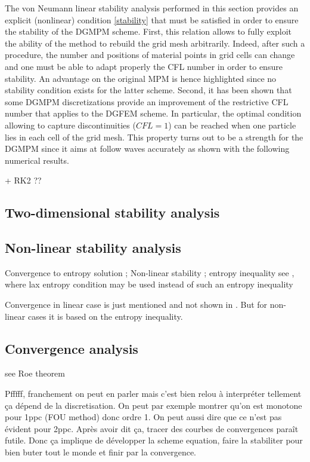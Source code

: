 The von Neumann linear stability analysis performed in this section provides an explicit (nonlinear) condition \eqref{stability} that must be satisfied in order to ensure the stability of the DGMPM scheme. First, this relation allows to fully exploit the ability of the method to rebuild the grid mesh arbitrarily. Indeed, after such a procedure, the number and positions of material points in grid cells can change and one must be able to adapt properly the CFL number in order to ensure stability. An advantage on the original MPM is hence highlighted since no stability condition exists for the latter scheme. Second, it has been shown that some DGMPM discretizations provide an improvement of the restrictive CFL number that applies to the DGFEM scheme. In particular, the optimal condition allowing to capture discontinuities ($CFL=1$) can be reached when one particle lies in each cell of the grid mesh. This property turns out to be a strength for the DGMPM since it aims at follow waves accurately as shown with the following numerical results.


+ RK2 ??
\subsection{Two-dimensional stability analysis}


\subsection{Non-linear stability analysis}
Convergence to entropy solution ; Non-linear stability ; entropy inequality
see \cite[p.219]{Leveque}, where lax entropy condition may be used instead of such an entropy inequality

Convergence in linear case is just mentioned and not shown in \cite{Cockburn}. But for non-linear cases it is based on the entropy inequality.

\subsection{Convergence analysis}
see Roe theorem \cite[p.417]{Toro}


Pfffff, franchement on peut en parler mais c'est bien relou à interpréter tellement ça dépend de la discretisation. On peut par exemple montrer qu'on est monotone pour 1ppc (FOU method) donc ordre 1. On peut aussi dire que ce n'est pas évident pour 2ppc. Après avoir dit ça, tracer des courbes de convergences paraît futile. Donc ça implique de développer la scheme equation, faire la stabiliter pour bien buter tout le monde et finir par la convergence.

